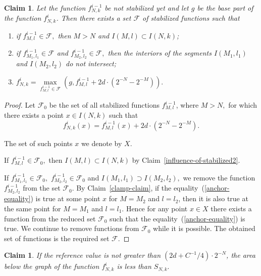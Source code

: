 \documentclass[12pt]{article}
\newtheorem{clai}[prop]{Claim}
\theoremstyle{definition}
\begin{document}
\begin{clai}
\label{overview-claim}
Let the function $f_{N,k}^{i-1}$ be not stabilized yet and let $g$ be the base part of the function $f_{N,k}^i$. Then there exists a set $\mathcal F$ of stabilized functions such that
\begin{enumerate}[label = \arabic*), ref = \arabic*)]
\item if $f_{M,l}^{i-1}\in\mathcal F,$ then $M>N$ and $I(M,l)\subset I(N,k)$;
\item if $f_{M_1, l_1}^{i-1}\in \mathcal F$ and $f_{M_2,l_2}^{i-1}\in \mathcal F,$ then the interiors of the segments $I(M_1, l_1)$ and $I(M_2, l_2)$ do not intersect;
\item $f_{N,k}^i = \max\limits_{f_{M,l}^{i-1}\in\mathcal F}\left(g, f_{M,l}^{i-1} + 2d\cdot\left(2^{-N}-2^{-M}\right)\right).$
\end{enumerate}
\end{clai}

\begin{proof}
Let $\mathcal F_0$ be the set of all stabilized functions $f_{M,l}^{i-1}$, where $M>N,$ for which there exists a point $x\in I(N,k)$ such that
\begin{equation}
\label{anchor-equality}
f_{N,k}^i (x) =  f_{M,l}^{i-1}(x) + 2d\cdot \left(2^{-N} - 2^{-M}\right).
\end{equation}

The set of such points $x$ we denote by $X$.

If $f_{M,l}^{i-1}\in \mathcal F_0,$ then $I(M,l)\subset I(N,k)$ by Claim~\ref{influence-of-stabilized2}.

If $f_{M_1,l_1}^{i-1}\in \mathcal F_0,$ $f_{M_2,l_2}^{i-1}\in \mathcal F_0$ and $I(M_1, l_1)\supset I(M_2, l_2),$ we remove the function $f_{M_2,l_2}^{i-1}$ from the set $\mathcal F_0$. By Claim~\ref{clamp-claim}, if the equality~(\ref{anchor-equality}) is true at some point $x$ for $M = M_2$ and $l = l_2$, then it is also true at the same point for $M = M_1$ and $l = l_1.$ Hence for any point $x\in X$ there exists a function from the reduced set $\mathcal F_0$ such that the equality~(\ref{anchor-equality}) is true. We continue to remove functions from $\mathcal F_0$ while it is possible. The obtained set of functions is the required set $\mathcal F.$
\end{proof}

\begin{clai}
\label{minimal-y0}
If the reference value is not greater than $\left(2d + C^{-1}/4\right)\cdot 2^{-N}$, the area below the graph of the function $f_{N,k}^i$ is less than $S_{N,k}.$
\end{clai}
\end{document}
